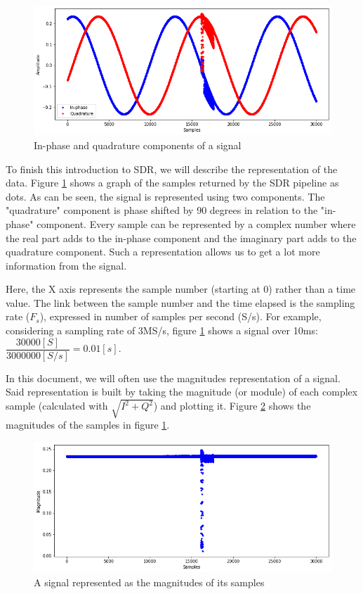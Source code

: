 \begin{figure}[htp!]
  \centering
  \includegraphics[scale=0.5]{figures/concepts_IQ-signal.png}
  \caption{In-phase and quadrature components of a signal}
  \label{fig:iq-signal}
\end{figure}

To finish this introduction to SDR, we will describe the representation of the data. Figure \ref{fig:iq-signal} shows a graph of the samples returned by the SDR pipeline as dots. As can be seen, the signal is represented using two components. The "quadrature" component is phase shifted by 90 degrees in relation to the "in-phase" component. Every sample can be represented by a complex number where the real part adds to the in-phase component and the imaginary part adds to the quadrature component. Such a representation allows us to get a lot more information from the signal. \cite{kuisma_iq, ossmann_software}

Here, the X axis represents the sample number (starting at 0) rather than a time value. The link between the sample number and the time elapsed is the sampling rate ($F_s$), expressed in number of samples per second (S/s). For example, considering a sampling rate of 3MS/s, figure \ref{fig:iq-signal} shows a signal over 10ms: $\dfrac{30000[S]}{3000000[S/s]} = 0.01[s]$.

In this document, we will often use the magnitudes representation of a signal. Said representation is built by taking the magnitude (or module) of each complex sample (calculated with $\sqrt{I^2 + Q^2}$) and plotting it. Figure \ref{fig:mag} shows the magnitudes of the samples in figure \ref{fig:iq-signal}.

\begin{figure}[htp!]
  \centering
  \includegraphics[scale=0.5]{figures/concepts_magnitudes.png}
  \caption{A signal represented as the magnitudes of its samples}
  \label{fig:mag}
\end{figure}

